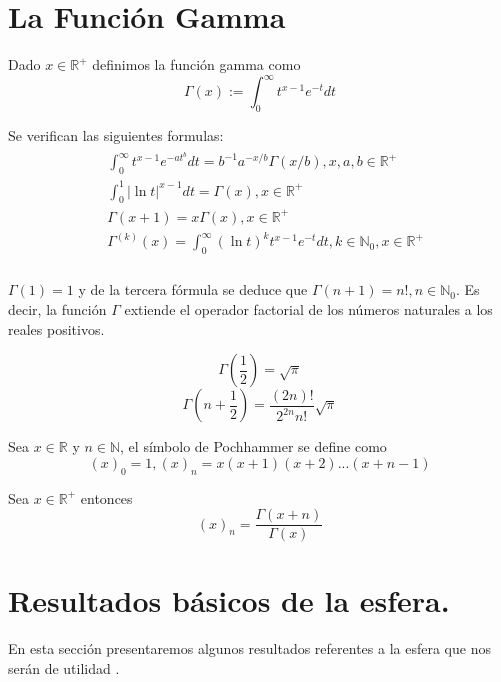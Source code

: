
\chapter{La Función Gamma}\label{aped.A}
\begin{defn} Dado $x\in\mathds{R}^+$ definimos la función gamma\cite[sec. 1.2]{libro_esfarm} como
	$$
	\Gamma(x) := \int_{0}^{\infty} t^{x-1}e^{-t}dt		
	$$
\end{defn}
\begin{prop}Se verifican las siguientes formulas:
	\begin{gather}
	\begin{aligned}
	&\int_{0}^{\infty}  t^{x-1}e^{-at^b}dt = b^{-1}a^{-x/b}\Gamma(x/b)  , x,a,b \in \mathds{R}^+ \\
	&\int_{0}^{1} |\ln{t}|^{x-1}dt = \Gamma(x),   x \in \mathds{R}^+  \\
	&\Gamma(x+1) = x \Gamma(x) ,		x\in \mathds{R}^+ \\
	&\Gamma^{(k)}(x) = \int_{0}^{\infty} (\ln{t})^k t^{x-1} e^{-t} dt,   k\in\mathds{N}_0,x\in\mathds{R}^+ \\
	\end{aligned}
	\end{gather}
\end{prop}
\begin{rem}
	$\Gamma(1)=1$ y de la tercera fórmula se deduce que $\Gamma(n+1)=n!, n\in\mathds{N}_0$. Es decir, la función $\Gamma$ extiende el operador factorial de los números naturales a los reales positivos.
\end{rem}
\begin{lem} 
	$$
	\Gamma(\frac{1}{2}) = 	\sqrt{\pi}
	$$
	$$
	\Gamma(n+\frac{1}{2})=\frac{(2n)!}{2^{2n}n!} \sqrt{\pi}
	$$
\end{lem}
\begin{defn}Sea $x\in\mathds{R}$ y $n\in\mathds{N}$, el símbolo de Pochhammer se define como
	$$
	(x)_0 = 1, (x)_n=x(x+1)(x+2)...(x+n-1)
	$$
\end{defn}
\begin{prop} Sea $x\in\mathds{R}^+$ entonces
	$$
	(x)_n = \frac{\Gamma(x+n)}{\Gamma(x)}
	$$
\end{prop}
\chapter{Resultados básicos de la esfera.}\label{aped.B}
En esta sección presentaremos algunos resultados referentes a la esfera que nos serán de utilidad \cite[sec 1.3]{libro_esfarm}.
\bigskip


